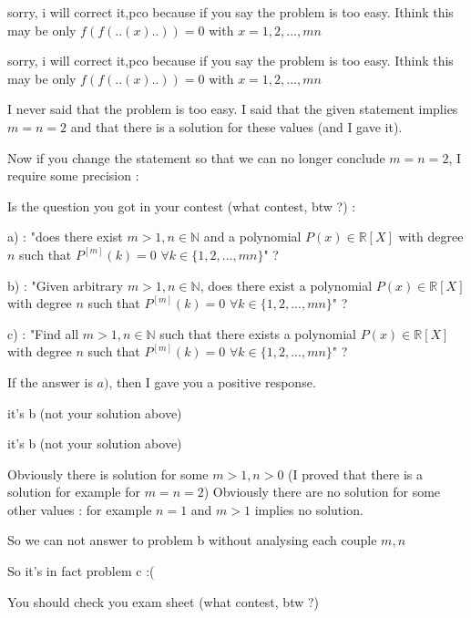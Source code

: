 \begin{solution}
	sorry, i will correct it,pco because if you say the problem is too easy. Ithink this may be only  $f(f(..(x)..))=0$ with $x=1,2,...,mn$
\end{solution}



\begin{solution}
	\begin{tcolorbox}sorry, i will correct it,pco because if you say the problem is too easy. Ithink this may be only  $f(f(..(x)..))=0$ with $x=1,2,...,mn$\end{tcolorbox}
I never said that the problem is too easy. I said that the given statement implies $m=n=2$ and that there is a solution for these values (and I gave it).

Now if you change the statement so that we can no longer conclude $m=n=2$, I require some precision :

Is the question you got in your contest (what contest, btw ?) :

a) : "does there exist $m>1,n\in\mathbb N$ and a polynomial $P(x)\in\mathbb R[X]$ with degree $n$ such that $P^{[m]}(k)=0$ $\forall k\in\{1,2,...,mn\}$" ?

b) : "Given arbitrary $m>1,n\in\mathbb N$, does there exist a polynomial $P(x)\in\mathbb R[X]$ with degree $n$ such that $P^{[m]}(k)=0$ $\forall k\in\{1,2,...,mn\}$" ?

c) : "Find all $m>1,n\in\mathbb N$ such that there exists a polynomial $P(x)\in\mathbb R[X]$ with degree $n$ such that $P^{[m]}(k)=0$ $\forall k\in\{1,2,...,mn\}$" ?

If the answer is $a)$, then I gave you a positive response.
\end{solution}



\begin{solution}
	it's b (not your solution above)
\end{solution}



\begin{solution}
	\begin{tcolorbox}it's b (not your solution above)\end{tcolorbox}
Obviously there is solution for some $m>1,n>0$ (I proved that there is a solution for example for $m=n=2$)
Obviously there are no solution for some other values : for example $n=1$ and $m>1$ implies no solution.

So we can not answer to problem b without analysing each couple $m,n$

So it's in fact problem c :(

You should check you exam sheet (what contest, btw ?)
\end{solution}



